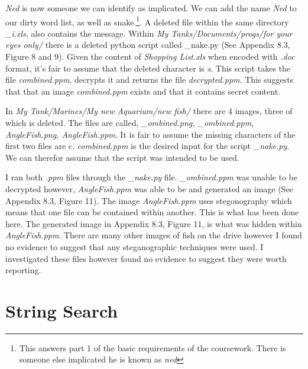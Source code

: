 \documentclass[12pt]{article}
\begin{document}
				\noindent \textit{Ned} is now someone we can identify as implicated. We can add the name \textit{Ned} to our dirty word list, as well as snake.\footnote{This answers part 1 of the basic requirements of the coursework. There is someone else implicated he is known as \textit{ned}}. A deleted file within the same directory \textit{\_i.xls}, also contains the message.  \newline\newline
				Within \textit{My Tanks/Documents/progs/for your eyes only/} there is a deleted python script called \_nake.py (See Appendix 8.3, Figure 8 and 9). Given the content of \textit{Shopping List.xls} when encoded with \textit{.doc} format, it's fair to assume that the deleted character is \textit{s}. This script takes the file \textit{combined.ppm}, decrypts it and returns the file \textit{decrypted.ppm}. This suggests that that an image \textit{combined.ppm} exists and that it contains secret content.\newline\newline

				\noindent In \textit{My Tank/Marines/My new Aquarium/new fish/} there are 4 images, three of which is deleted. The files are called, \textit{\_ombined.png, \_ombined.ppm, AngleFish.png, AngleFish.ppm}. It is fair to assume the missing characters of the first two files are c. \textit{combined.ppm} is the desired input for the script \textit{\_nake.py}. We can therefor assume that the script was intended to be used.\newline\newline

				\noindent I ran both \textit{.ppm} files through the \textit{\_nake.py} file. \textit{\_ombined.ppm} was unable to be decrypted however, \textit{AngleFish.ppm} was able to be and generated an image (See Appendix 8.3, Figure 11). The image \textit{AngleFish.ppm} uses stegonography which means that one file can be contained within another. This is what has been done here. The generated image in Appendix 8.3, Figure 11, is what was hidden within \textit{AngleFish.ppm}.\newline
				There are many other images of fish on the drive however I found no evidence to suggest that any steganographic techniques were used. I investigated these files however found no evidence to suggest they were worth reporting.

			\section{String Search}
\end{document}
